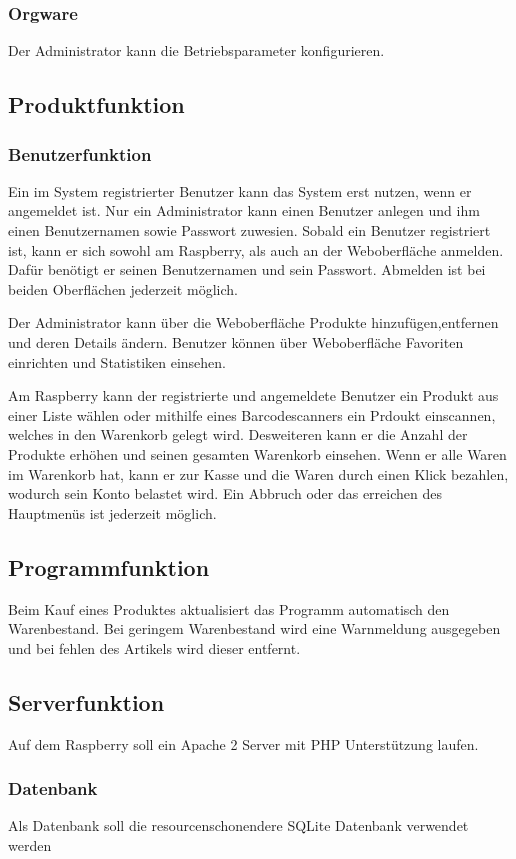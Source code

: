 \documentclass[11pt,a4paper]{article} %
\begin{document}
\subsubsection{Orgware}
Der Administrator kann die Betriebsparameter konfigurieren.

\subsection{Produktfunktion}
\subsubsection{Benutzerfunktion}
Ein im System registrierter Benutzer kann das System erst nutzen, wenn er angemeldet ist.
Nur ein Administrator kann einen Benutzer anlegen und ihm einen Benutzernamen sowie Passwort zuwesien. Sobald ein Benutzer registriert ist, kann er sich sowohl am Raspberry, als auch an der Weboberfläche anmelden. Dafür benötigt er seinen Benutzernamen und sein Passwort. Abmelden ist bei beiden Oberflächen jederzeit möglich.
\par
Der Administrator kann über die Weboberfläche Produkte hinzufügen,entfernen und deren Details ändern. Benutzer können über Weboberfläche Favoriten einrichten und Statistiken einsehen.
\par
Am Raspberry kann der registrierte und angemeldete Benutzer ein Produkt aus einer Liste wählen oder mithilfe eines Barcodescanners ein Prdoukt einscannen, welches in den Warenkorb gelegt wird. Desweiteren kann er die Anzahl der Produkte erhöhen und seinen gesamten Warenkorb einsehen. Wenn er alle Waren im Warenkorb hat, kann er zur Kasse und die Waren durch einen Klick bezahlen, wodurch sein Konto belastet wird. Ein Abbruch oder das erreichen des Hauptmenüs ist jederzeit möglich.

\subsection{Programmfunktion}
Beim Kauf eines Produktes aktualisiert das Programm automatisch den Warenbestand. Bei geringem Warenbestand wird eine Warnmeldung ausgegeben und bei fehlen des Artikels wird dieser entfernt.

\subsection{Serverfunktion}
Auf dem Raspberry soll ein Apache 2 Server mit PHP Unterstützung laufen.
\subsubsection{Datenbank}
Als Datenbank soll die resourcenschonendere SQLite Datenbank verwendet werden
\end{document}
